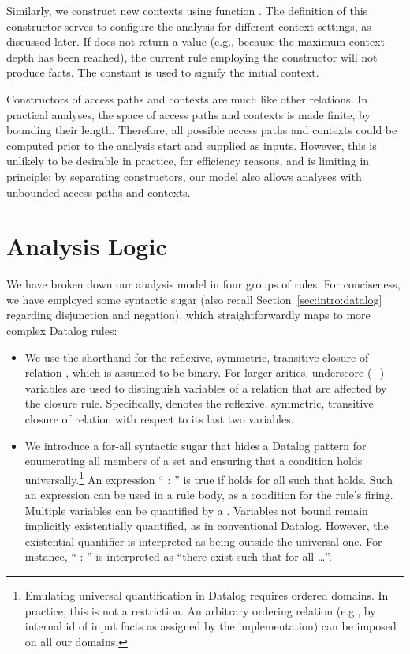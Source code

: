 Similarly, we construct new contexts using function . The definition of this constructor serves to configure the analysis for different context settings, as discussed later. If  does not return a value (e.g., because the maximum context depth has been reached), the current rule employing the constructor will not produce facts. The constant \dlAll{} is used to signify the initial context.

Constructors of access paths and contexts are much like other relations. In practical analyses, the space of access paths and contexts is made finite, by bounding their length. Therefore, all possible access paths and contexts could be computed prior to the analysis start and supplied as inputs. However, this is unlikely to be desirable in practice, for efficiency reasons, and is limiting in principle: by separating constructors, our model also allows analyses with unbounded access paths and contexts.


\section{Analysis Logic}

We have broken down our analysis model in four groups of rules. For conciseness, we have employed some syntactic sugar (also recall Section~\ref{sec:intro:datalog} regarding disjunction and negation), which straightforwardly maps to more complex Datalog rules:

\begin{itemize}
\item We use the shorthand  for the reflexive, symmetric, transitive closure of relation , which is assumed to be binary. For larger arities, underscore (\_) variables are used to distinguish variables of a relation that are affected by the closure rule. Specifically,  denotes the reflexive, symmetric, transitive closure of relation  with respect to its last two variables.

\item We introduce a for-all syntactic sugar that hides a Datalog pattern for enumerating all members of a set and ensuring that a condition holds universally.\footnote{Emulating universal quantification in Datalog requires ordered domains. In practice, this is not a restriction. An arbitrary ordering relation (e.g., by internal id of input facts as assigned by the implementation) can be imposed on all our domains.} An expression ``\dlforall{} :  \dlThen{} '' is true if  holds for all  such that  holds. Such an expression can be used in a rule body, as a condition for the rule's firing. Multiple variables can be quantified by a \dlforall{}. Variables not bound remain implicitly existentially quantified, as in conventional Datalog. However, the existential quantifier is interpreted as being outside the universal one. For instance, ``\dlforall{} :  \dlThen{} '' is interpreted as ``there exist  such that for all  \ldots''.
\end{itemize}


